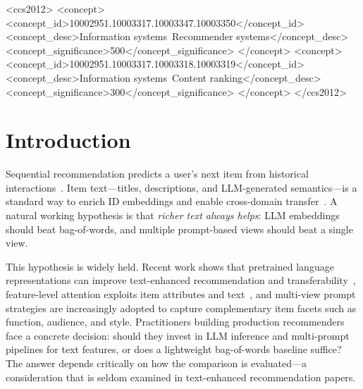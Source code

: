 \documentclass[sigconf,natbib=true,anonymous]{acmart}
\begin{document}
\begin{CCSXML}
<ccs2012>
 <concept>
  <concept_id>10002951.10003317.10003347.10003350</concept_id>
  <concept_desc>Information systems~Recommender systems</concept_desc>
  <concept_significance>500</concept_significance>
 </concept>
 <concept>
  <concept_id>10002951.10003317.10003318.10003319</concept_id>
  <concept_desc>Information systems~Content ranking</concept_desc>
  <concept_significance>300</concept_significance>
 </concept>
</ccs2012>
\end{CCSXML}


\maketitle

\section{Introduction}
\label{sec:intro}

Sequential recommendation predicts a user's next item from historical interactions~\cite{kang2018sasrec,sun2019bert4rec,hidasi2016gru4rec}.
Item text---titles, descriptions, and LLM-generated semantics---is a standard way to enrich ID embeddings and enable cross-domain transfer~\cite{hou2022unisrec,bao2023tallrec}.
A natural working hypothesis is that \emph{richer text always helps}: LLM embeddings should beat bag-of-words, and multiple prompt-based views should beat a single view.

This hypothesis is widely held.
Recent work shows that pretrained language representations can improve text-enhanced recommendation and transferability~\cite{hou2022unisrec,li2023recformer,bao2023tallrec}, feature-level attention exploits item attributes and text~\cite{zhang2019fdsa}, and multi-view prompt strategies are increasingly adopted to capture complementary item facets such as function, audience, and style.
Practitioners building production recommenders face a concrete decision: should they invest in LLM inference and multi-prompt pipelines for text features, or does a lightweight bag-of-words baseline suffice?
The answer depends critically on how the comparison is evaluated---a consideration that is seldom examined in text-enhanced recommendation papers.
\end{document}
